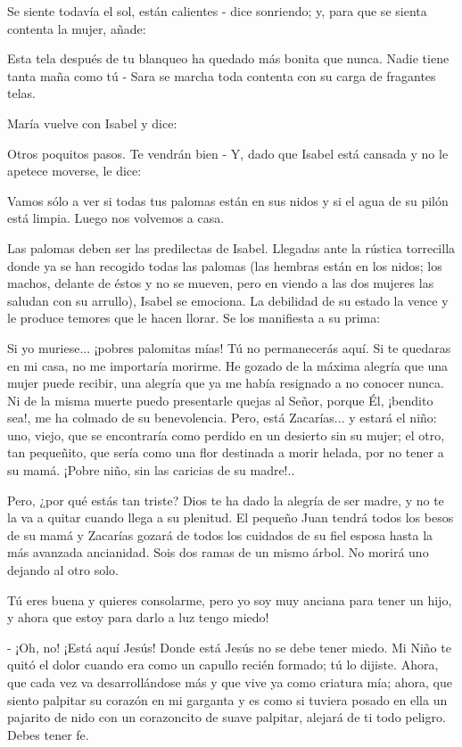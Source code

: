 \documentclass[12pt]{book} %
\begin{document}
Se siente todavía el sol, están calientes - dice sonriendo; y, para que se sienta contenta la mujer, añade: 

Esta tela después de tu blanqueo ha quedado más bonita que nunca. Nadie tiene tanta maña como tú - Sara se marcha toda contenta con su carga de fragantes telas. 

María vuelve con Isabel y dice: 

Otros poquitos pasos. Te vendrán bien - Y, dado que Isabel está cansada y no le apetece moverse, le dice: 

Vamos sólo a ver si todas tus palomas están en sus nidos y si el agua de su pilón está limpia. Luego nos volvemos a casa. 

Las palomas deben ser las predilectas de Isabel. Llegadas ante la rústica torrecilla donde ya se han recogido todas las palomas (las hembras están en los nidos; los machos, delante de éstos y no se mueven, pero en viendo a las dos mujeres las saludan con su arrullo), Isabel se emociona. La debilidad de su estado la vence y le produce temores que le hacen llorar. Se los manifiesta a su prima: 

Si yo muriese... ¡pobres palomitas mías! Tú no permanecerás aquí. Si te quedaras en mi casa, no me importaría morirme. He gozado de la máxima alegría que una mujer puede recibir, una alegría que ya me había resignado a no conocer nunca. Ni de la misma muerte puedo presentarle quejas al Señor, porque Él, ¡bendito sea!, me ha colmado de su benevolencia. Pero, está Zacarías... y estará el niño: uno, viejo, que se encontraría como perdido en un desierto sin su mujer; el otro, tan pequeñito, que sería como una flor destinada a morir helada, por no tener a su mamá. ¡Pobre niño, sin las caricias de su madre!.. 

Pero, ¿por qué estás tan triste? Dios te ha dado la alegría de ser madre, y no te la va a quitar cuando llega a su plenitud. El pequeño Juan tendrá todos los besos de su mamá y Zacarías gozará de todos los cuidados de su fiel esposa hasta la más avanzada ancianidad. Sois dos ramas de un mismo árbol. No morirá uno dejando al otro solo. 

Tú eres buena y quieres consolarme, pero yo soy muy anciana para tener un hijo, y ahora que estoy para darlo a luz tengo miedo! 

- ¡Oh, no! ¡Está aquí Jesús! Donde está Jesús no se debe tener miedo. Mi Niño te quitó el dolor cuando era como un capullo recién formado; tú lo dijiste. Ahora, que cada vez va desarrollándose más y que vive ya como criatura mía; ahora, que siento palpitar su corazón en mi garganta y es como si tuviera posado en ella un pajarito de nido con un corazoncito de suave palpitar, alejará de ti todo peligro. Debes tener fe. 
\end{document}
